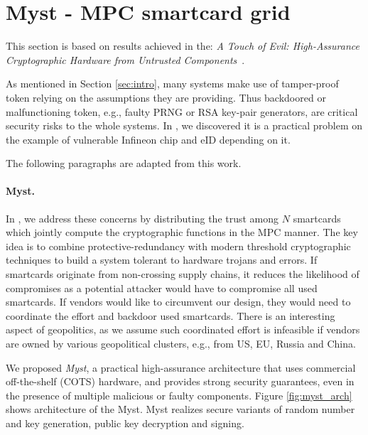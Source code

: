 \documentclass[
  digital, %
  twoside, %
  table,   %
  lof,     %
  lot,     %
]{fithesis3}
\newcounter{ph4_show_guides}
\theoremstyle{definition}
\theoremstyle{remark}
\begin{document}
% 

\section{Myst - MPC smartcard grid}\label{sec:res:myst}
This section is based on results achieved in the: \emph{A Touch of Evil: High-Assurance Cryptographic Hardware from Untrusted Components}~\cite{2017-ccs-mavroudis}. 

As mentioned in Section \ref{sec:intro}, many systems make use of tamper-proof token relying on the assumptions they are providing. Thus backdoored or malfunctioning token, e.g., faulty PRNG or RSA key-pair generators, are 
critical security risks to the whole systems. In \cite{2017-ccs-nemec}, we discovered it is a practical problem on the example of vulnerable Infineon chip and eID depending on it.

The following paragraphs are adapted from this work.%

\paragraph{Myst.}%
In \cite{2017-ccs-mavroudis}, we address these concerns by distributing the trust among $N$ smartcards which jointly compute the cryptographic functions in the MPC manner. 
The key idea is to combine
protective-redundancy with modern threshold cryptographic techniques to build a system tolerant to hardware trojans and errors. 
If smartcards originate from non-crossing supply chains, it reduces the likelihood of compromises as a potential attacker would have to compromise all used smartcards. 
If vendors would like to circumvent our design, they would need to coordinate the effort and backdoor used smartcards. There is an interesting aspect of geopolitics, as we assume such coordinated effort is infeasible if vendors are owned by various geopolitical clusters, e.g., from US, EU, Russia and China.

We proposed \emph{Myst}, a practical high-assurance architecture that uses commercial off-the-shelf (COTS) hardware, and provides strong security guarantees, even in the presence of multiple malicious or faulty components. Figure \ref{fig:myst_arch} shows architecture of the Myst.
Myst realizes secure variants of random number and key generation, public key decryption and signing.  
\end{document}
